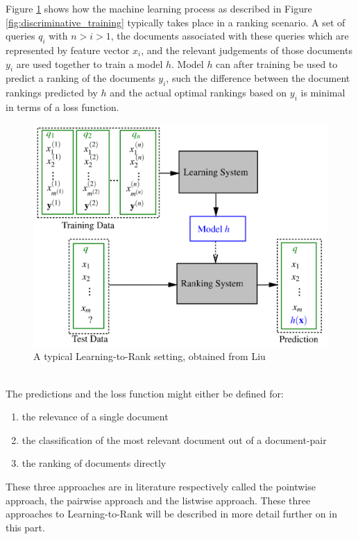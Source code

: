 Figure \ref{fig:ltr_framework} shows how the machine learning process as described in Figure \ref{fig:discriminative_training} typically takes place in a ranking scenario. A set of queries $q_i$ with $n > i > 1$, the documents associated with these queries which are represented by feature vector $x_i$, and the relevant judgements of those documents $y_i$ are used together to train a model $h$. Model $h$ can after training be used to predict a ranking of the documents $y_i$, such the difference between the document rankings predicted by $h$ and the actual optimal rankings based on $y_i$ is minimal in terms of a loss function.
\begin{figure}[!h]
\includegraphics[scale=0.25]{gfx/ltr_framework}
\caption{A typical Learning-to-Rank setting, obtained from Liu \cite{Liu2007}}
\label{fig:ltr_framework}
\end{figure}\\

The predictions and the loss function might either be defined for:
\begin{enumerate}
\item the relevance of a single document
\item the classification of the most relevant document out of a document-pair
\item the ranking of documents directly
\end{enumerate}
These three approaches are in literature respectively called the pointwise approach, the pairwise approach and the listwise approach. These three approaches to Learning-to-Rank will be described in more detail further on in this part.

